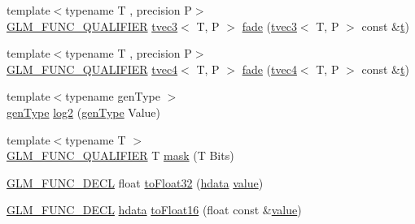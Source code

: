 \begin{DoxyCompactItemize}
\item 
{\footnotesize template$<$typename T , precision P$>$ }\\\mbox{\hyperlink{setup_8hpp_a33fdea6f91c5f834105f7415e2a64407}{G\+L\+M\+\_\+\+F\+U\+N\+C\+\_\+\+Q\+U\+A\+L\+I\+F\+I\+ER}} \mbox{\hyperlink{structglm_1_1tvec3}{tvec3}}$<$ T, P $>$ \mbox{\hyperlink{namespaceglm_1_1detail_a9bf0a71c4b1705018e6f8f6be966f023}{fade}} (\mbox{\hyperlink{structglm_1_1tvec3}{tvec3}}$<$ T, P $>$ const \&\mbox{\hyperlink{glad_8h_aef9f00bf06d58b8db7e501e287488401}{t}})
\item 
{\footnotesize template$<$typename T , precision P$>$ }\\\mbox{\hyperlink{setup_8hpp_a33fdea6f91c5f834105f7415e2a64407}{G\+L\+M\+\_\+\+F\+U\+N\+C\+\_\+\+Q\+U\+A\+L\+I\+F\+I\+ER}} \mbox{\hyperlink{structglm_1_1tvec4}{tvec4}}$<$ T, P $>$ \mbox{\hyperlink{namespaceglm_1_1detail_adfc056f3be3f0501412b6d8c8d1b60fb}{fade}} (\mbox{\hyperlink{structglm_1_1tvec4}{tvec4}}$<$ T, P $>$ const \&\mbox{\hyperlink{glad_8h_aef9f00bf06d58b8db7e501e287488401}{t}})
\item 
{\footnotesize template$<$typename gen\+Type $>$ }\\\mbox{\hyperlink{structglm_1_1detail_1_1gen_type}{gen\+Type}} \mbox{\hyperlink{namespaceglm_1_1detail_a3d24a612f2c5fa4f3aaf97dcd979ef1c}{log2}} (\mbox{\hyperlink{structglm_1_1detail_1_1gen_type}{gen\+Type}} Value)
\item 
{\footnotesize template$<$typename T $>$ }\\\mbox{\hyperlink{setup_8hpp_a33fdea6f91c5f834105f7415e2a64407}{G\+L\+M\+\_\+\+F\+U\+N\+C\+\_\+\+Q\+U\+A\+L\+I\+F\+I\+ER}} T \mbox{\hyperlink{namespaceglm_1_1detail_a048ad00e8777f9f3ebe185ed48857df0}{mask}} (T Bits)
\item 
\mbox{\hyperlink{setup_8hpp_ab2d052de21a70539923e9bcbf6e83a51}{G\+L\+M\+\_\+\+F\+U\+N\+C\+\_\+\+D\+E\+CL}} float \mbox{\hyperlink{namespaceglm_1_1detail_a8e4719d94d99ee1e625496e04317272b}{to\+Float32}} (\mbox{\hyperlink{namespaceglm_1_1detail_aa2115f7dd38e14fea7ba9e95104120f3}{hdata}} \mbox{\hyperlink{glad_8h_a03aff08f73d7fde3d1a08e0abd8e84fa}{value}})
\item 
\mbox{\hyperlink{setup_8hpp_ab2d052de21a70539923e9bcbf6e83a51}{G\+L\+M\+\_\+\+F\+U\+N\+C\+\_\+\+D\+E\+CL}} \mbox{\hyperlink{namespaceglm_1_1detail_aa2115f7dd38e14fea7ba9e95104120f3}{hdata}} \mbox{\hyperlink{namespaceglm_1_1detail_ac16321696a34b41c55f941b319d50652}{to\+Float16}} (float const \&\mbox{\hyperlink{glad_8h_a03aff08f73d7fde3d1a08e0abd8e84fa}{value}})
\item 

\end{DoxyCompactItemize}
